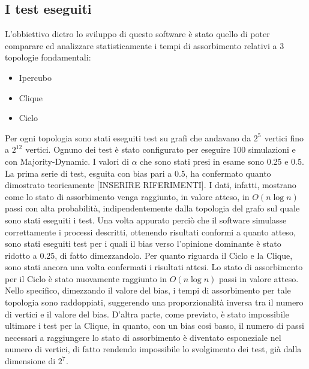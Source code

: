 \documentclass{article}
\begin{document}
\subsection{I test eseguiti}
 L'obbiettivo dietro lo sviluppo di questo software è stato quello di poter comparare ed analizzare statisticamente i tempi di assorbimento relativi a 3 topologie fondamentali:
 \begin{itemize}
\item Ipercubo
\item Clique
\item Ciclo
\end{itemize}
\newline
Per ogni topologia sono stati eseguiti test su grafi che andavano da $2^{5^{\mathrm{}}}$ vertici fino a $2^{12^{\mathrm{}}}$ vertici.\newline
Ognuno dei test è stato configurato per eseguire 100 simulazioni e con  Majority-Dynamic. \newline
I valori di $\alpha$ che sono stati presi in esame sono 0.25 e 0.5.\newline
\newline
La prima serie di test, esguita con bias pari a 0.5, ha confermato quanto dimostrato teoricamente [INSERIRE RIFERIMENTI]. I dati, infatti, mostrano come lo stato di assorbimento venga raggiunto, in valore atteso, in $O(n\log{}n)$ passi con alta probabilità, indipendentemente dalla topologia del grafo sul quale sono stati eseguiti i test.\newline
\newline
Una volta appurato perciò che il software simulasse correttamente i processi descritti, ottenendo risultati conformi a quanto atteso, sono stati eseguiti test per i quali il bias verso l'opinione dominante è stato ridotto a 0.25, di fatto dimezzandolo.\newline
Per quanto riguarda il Ciclo e la Clique, sono stati ancora una volta confermati i risultati attesi.
Lo stato di assorbimento per il Ciclo è stato nuovamente raggiunto in $O(n\log{}n)$ passi in valore atteso. Nello specifico, dimezzando il valore del bias, i tempi di assorbimento per tale topologia sono raddoppiati, suggerendo una proporzionalità inversa tra il numero di vertici e il valore del bias.\newline
D'altra parte, come previsto, è stato impossibile ultimare i test per la Clique, in quanto, con un bias cosi basso, il numero di passi necessari a raggiungere lo stato di assorbimento è diventato esponeziale nel numero di vertici, di fatto rendendo impossibile lo svolgimento dei test, già dalla dimensione di $2^{7^{\mathrm{}}}$.
\end{document}

